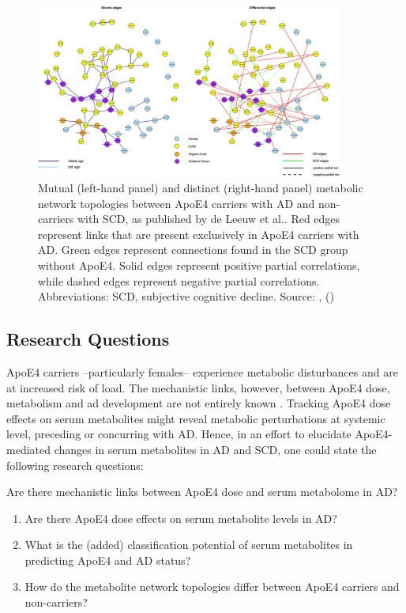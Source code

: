 \documentclass{amsart}
\begin{document}
\begin{figure}[htb]
\vspace*{-0.2cm}
  \includegraphics[width=0.9\textwidth]{figures/network.jpeg}
    \caption{Mutual (left-hand panel) and distinct (right-hand panel) metabolic network topologies between ApoE4 carriers with AD and non-carriers with SCD, as published by de Leeuw et al.. Red edges represent links that are present exclusively in ApoE4 carriers with AD. Green edges represent connections found in the SCD group without ApoE4. Solid edges represent positive partial correlations, while dashed edges represent negative partial correlations. Abbreviations: SCD, subjective cognitive decline. Source: , \citeauthor{deLeeuw2017Blood-basedDisease} (\citeyear{deLeeuw2017Blood-basedDisease}) \cite{deLeeuw2017Blood-basedDisease}}
  \label{netan17}
\end{figure}

\newpage
\subsection{Research Questions}
ApoE4 carriers --particularly females-- experience metabolic disturbances and are at increased risk of \acrshort{load}. The mechanistic links, however, between ApoE4 dose, metabolism and \acrshort{ad} development are not entirely known \cite{Fernandez-Calle2022APOEDiseases}. Tracking ApoE4 dose effects on serum metabolites might reveal metabolic perturbations at systemic level, preceding or concurring with AD. Hence, in an effort to elucidate ApoE4-mediated changes in serum metabolites in AD and SCD, one could state the following research questions:

Are there mechanistic links between ApoE4 dose and serum metabolome in AD?
\begin{enumerate}
    \item Are there ApoE4 dose effects on serum metabolite levels in AD?
    \item What is the (added) classification potential of serum metabolites in predicting ApoE4 and AD status?   
    \item How do the metabolite network topologies differ between ApoE4 carriers and non-carriers?
\end{enumerate}
\end{document}
